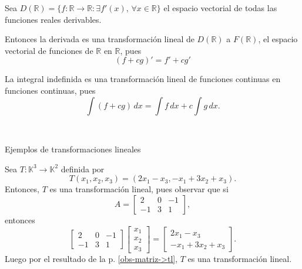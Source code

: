 \documentclass{beamer} %
\newcommand{\K}{\mathbb K}
\begin{document}
\begin{frame}

\begin{ejemplo*} Sea $D(\mathbb R) = \{f:\mathbb R \to \mathbb R: \exists f'(x),\, \forall x \in \mathbb R\}$ el espacio vectorial de todas las funciones reales derivables.  \pause

    Entonces la derivada es una transformación lineal de $D(\mathbb R)$ a $F(\mathbb R)$,  el espacio vectorial de funciones de $\mathbb R$ en  $\mathbb R$, pues
    $$(f+cg)'=f'+cg'$$\pause
\end{ejemplo*}

\begin{ejemplo*} La integral indefinida es una transformación lineal de funciones continuas en funciones continuas, pues
    $$\int (f+cg) \,dx=\int f \,dx+ c \int g \,dx.$$\pause
\end{ejemplo*}


\


\end{frame}



\begin{frame}{Ejemplos de transformaciones lineales}



\begin{ejemplo*}
        Sea $T : \K^3 \to \K^2$ definida por
        $$
        T(x_1,x_2,x_3) = (2x_1 - x_3, -x_1+3x_2+x_3).
        $$
        Entonces, $T$  es una transformación lineal, pues observar que si 
    $$
    A = \begin{bmatrix}
    2&0&-1 \\ -1&3&1
    \end{bmatrix},
    $$
    entonces
    $$
    \begin{bmatrix}
    2&0&-1 \\ -1&3&1
    \end{bmatrix} 
    \begin{bmatrix}
    x_1\\x_2\\x_3
    \end{bmatrix} =
    \begin{bmatrix}
    2x_1 - x_3 \\ -x_1+3x_2+x_3
    \end{bmatrix}.
    $$
    Luego por el resultado de la p. \ref{obs-matriz->tl}, $T$ es una transformación lineal.
    \end{ejemplo*}   

\end{frame}
\end{document}
